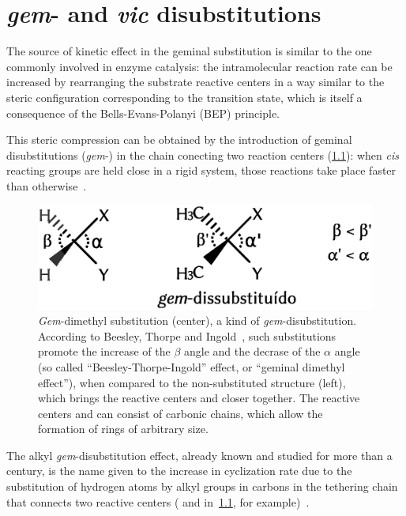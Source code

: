 \chapter{\emph{gem}- and \emph{vic} disubstitutions}%
\label{ch:gem-vic-disubstitions}

The source of kinetic effect in the geminal substitution is similar to the one
commonly involved in enzyme catalysis:
the intramolecular reaction rate can be
increased by rearranging the substrate reactive centers in a way similar to the
steric configuration corresponding to the transition state, which is itself a
consequence of the Bells-Evans-Polanyi (BEP) principle.

This steric compression can be obtained by the introduction of geminal
disubstitutions (\emph{gem}-) in the chain conecting two reaction centers
(\cref{fig:gem-dimetila}):
when \emph{cis} reacting groups are held close in a rigid system,
those reactions take place faster than
otherwise~\cite{Beesley_1915,Allinger_1960,Bruice_1960a,Bruice_1960b,Capon_1964,Bruice_1965,Kirby_1972,Galli_1979,Kirby_1980,Lightstone_1994,Kaneti_2004,Jung_2005,Karaman_2011}.
%
\begin{figure}[hbtp]
	\centering
	\includegraphics[width=.55\textwidth]{figures/gem-dimetil-pt}
	\caption[Beesley-Thorpe-Ingold effect, also known as geminal dimethyl
		effect.]{
		\emph{Gem}-dimethyl substitution (center), a kind of
		\emph{gem}-disubstitution.
		According to Beesley, Thorpe and Ingold~\cite{Beesley_1915,Jung_2005},
		such substitutions promote the increase of the $\beta$ angle and the
		decrase of the $\alpha$ angle (so called ``Beesley-Thorpe-Ingold''
		effect, or ``geminal dimethyl effect''),
		when compared to the non-substituted structure (left),
		which brings the reactive centers
		 and 
		closer together.
		The reactive centers  and  can consist of
		carbonic chains,
		which allow the formation of rings of arbitrary size.}\label{fig:gem-dimetila}
\end{figure}
%
The alkyl \emph{gem}-disubstitution effect,
already known and studied for more than a century,
is the name given to the increase in cyclization rate due
to the substitution of hydrogen atoms by alkyl groups in carbons in the
tethering chain that connects two reactive centers ( and 
in~\cref{fig:gem-dimetila}, for example)~\cite{Capon_1964,Kirby_1980,Kaneti_2004,Jung_2005}.

